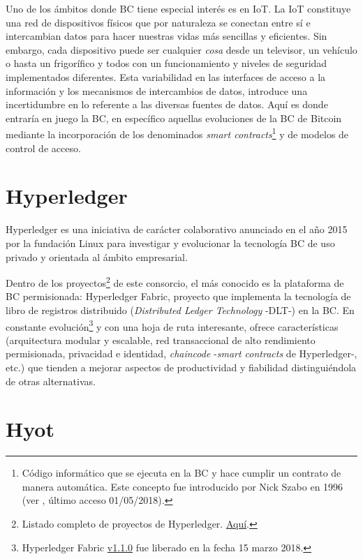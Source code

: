 \documentclass[10pt,conference,a4paper]{IEEEtran}
\begin{document}
Uno de los ámbitos donde BC tiene especial interés es en IoT\cite{dorri:2017:TOBI}. La IoT
constituye una red de dispositivos físicos que por naturaleza se
conectan entre sí e intercambian datos para hacer nuestras vidas más
sencillas y eficientes. Sin embargo, cada dispositivo puede ser
cualquier \textit{cosa} desde un televisor, un vehículo o hasta un frigorífico y todos con un funcionamiento y niveles de seguridad implementados diferentes. Esta variabilidad
en las interfaces de acceso a la información y los mecanismos de
intercambios de datos, introduce una incertidumbre en lo referente a
las diversas fuentes de datos. Aquí es donde entraría en juego la BC,
en específico aquellas evoluciones de la BC de Bitcoin mediante la
incorporación de los denominados \emph{smart
  contracts}\footnote{Código informático que se ejecuta en la
  BC y hace cumplir un contrato de manera automática. Este
  concepto fue introducido por Nick Szabo en 1996 (ver \cite{szabo:1997:FSRPN},
  último acceso 01/05/2018).} y
de modelos de control de acceso.

\section{Hyperledger}

Hyperledger es una iniciativa de carácter colaborativo anunciado en el año 2015 por la fundación Linux para investigar y evolucionar la tecnología BC de uso privado y orientada al ámbito empresarial.

Dentro de los proyectos\footnote{Listado completo de proyectos de Hyperledger. \href{https://www.hyperledger.org/projects}{Aquí}.} de este consorcio, el más conocido es la plataforma de BC permisionada: Hyperledger Fabric\cite{hyperledgerfabric:url}, proyecto que implementa la tecnología de libro de registros distribuido (\textit{Distributed Ledger Technology} -DLT-) en la BC. En constante evolución\footnote{Hyperledger Fabric \href{https://github.com/hyperledger/fabric/releases/tag/v1.1.0}{v1.1.0} fue liberado en la fecha 15 marzo 2018.} y con una hoja de ruta interesante\cite{hyperledgerfabricroadmap:url}, ofrece características\cite{vukolic:2017:HF} (arquitectura modular y escalable, red transaccional de alto rendimiento permisionada, privacidad e identidad, \textit{chaincode} -\textit{smart contracts} de Hyperledger-, etc.) que tienden a mejorar aspectos de productividad y fiabilidad distinguiéndola de otras alternativas.

\section{Hyot}
\end{document}

